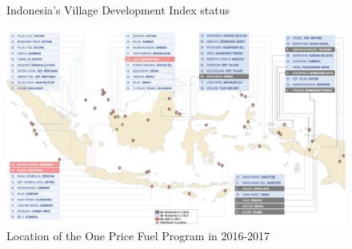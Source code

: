 \documentclass[letterpaper,12pt,leqno]{article}
\begin{document}
\begin{figure}[h]
\hfill
{}
\caption{Indonesia's Village Development Index status}
\label{f:2}\end{figure}

\begin{landscape}
\begin{figure}[t]
\includegraphics[scale=0.8]{Final_Project/image/BBM Satu Harga.png}
\caption{Location of the One Price Fuel Program in 2016-2017}
\label{f:3}
\end{figure}
\end{landscape}
 
\end{document}
